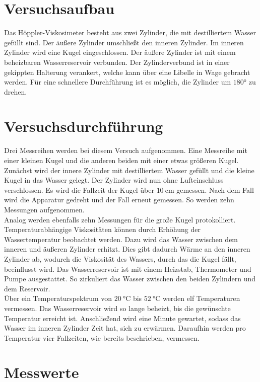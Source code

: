 


\section{Versuchsaufbau}
Das Höppler-Viskosimeter besteht aus zwei Zylinder, die mit destilliertem Wasser gefüllt sind. 
Der äußere Zylinder umschließt den inneren Zylinder. Im inneren Zylinder wird eine Kugel 
eingeschlossen. Der äußere Zylinder ist mit einem beheizbaren Wasserreservoir verbunden. 
Der Zylinderverbund ist in einer gekippten Halterung verankert, welche kann über eine Libelle 
in Wage gebracht werden. Für eine schnellere Durchführung ist es möglich, die Zylinder um 
$\ang{180;;}$ zu drehen.


\section{Versuchsdurchführung}
Drei Messreihen werden bei diesem Versuch aufgenommen. Eine Messreihe mit einer kleinen Kugel 
und die anderen beiden mit einer etwas größeren Kugel. Zunächst wird der innere Zylinder mit  
destilliertem Wasser gefüllt und die kleine Kugel in das Wasser gelegt. Der Zylinder wird nun 
ohne Lufteinschluss verschlossen. Es wird die Fallzeit der Kugel über $\qty{10}{\centi \meter}$
gemessen. Nach dem Fall wird die Apparatur gedreht und der Fall erneut gemessen. So werden zehn 
Messungen aufgenommen.\\
\noindent Analog werden ebenfalls zehn Messungen für die große Kugel protokolliert. \\
\noindent Temperaturabhängige Viskositäten können durch Erhöhung der Wassertemperatur beobachtet werden. 
Dazu wird das Wasser zwischen dem inneren und äußeren Zylinder erhitzt. Dies gibt dadurch Wärme 
an den inneren Zylinder ab, wodurch die Viskosität des Wassers, durch das die Kugel fällt, beeinflusst wird.
Das Wasserreservoir ist mit einem Heizstab, Thermometer und Pumpe ausgestattet. So zirkuliert das Wasser 
zwischen den beiden Zylindern und dem Reservoir.\\
Über ein Temperaturspektrum von $\qty{20}{\celsius}$ bis $\qty{52}{\celsius}$ werden elf Temperaturen vermessen. 
Das Wasserreservoir wird so lange beheizt, bis die gewünschte Temperatur erreicht ist. Anschließend wird eine 
Minute gewartet, sodass das Wasser im inneren Zylinder Zeit hat, sich zu erwärmen. Daraufhin werden pro Temperatur 
vier Fallzeiten, wie bereits beschrieben, vermessen.



\section{Messwerte}



